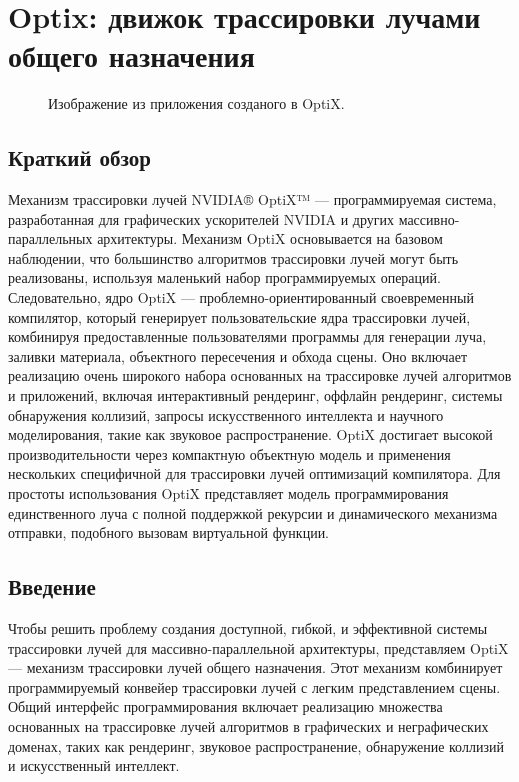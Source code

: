 \section{Optix: движок трассировки лучами общего назначения}
\begin{figure}[h]
\caption{Изображение из приложения созданого в OptiX.}
\label{audi}
\end{figure}
\subsection{Краткий обзор}
Механизм трассировки лучей NVIDIA® OptiX™ --- программируемая система, разработанная для графических ускорителей NVIDIA и других массивно-параллельных архитектуры.
Механизм OptiX основывается на базовом наблюдении, что большинство алгоритмов трассировки лучей могут быть реализованы, используя маленький набор программируемых операций. 
Следовательно, ядро OptiX --- проблемно-ориентированный своевременный компилятор, который генерирует пользовательские ядра трассировки лучей, комбинируя предоставленные пользователями программы для генерации луча, заливки материала, объектного пересечения и обхода сцены. 
Оно включает реализацию очень широкого набора основанных на трассировке лучей алгоритмов и приложений, включая интерактивный рендеринг, оффлайн рендеринг, системы обнаружения коллизий, запросы искусственного интеллекта и научного моделирования, такие как звуковое распространение. 
OptiX достигает высокой производительности через компактную объектную модель и применения нескольких специфичной для трассировки лучей оптимизаций компилятора. 
Для простоты использования OptiX представляет модель программирования единственного луча с полной поддержкой рекурсии и динамического механизма отправки, подобного вызовам виртуальной функции.

\subsection{Введение}
Чтобы решить проблему создания доступной, гибкой, и эффективной системы трассировки лучей для массивно-параллельной архитектуры, представляем OptiX --- механизм трассировки лучей общего назначения. 
Этот механизм комбинирует программируемый конвейер трассировки лучей с легким представлением сцены. 
Общий интерфейс программирования включает реализацию множества основанных на трассировке лучей алгоритмов в графических и неграфических доменах, таких как рендеринг, звуковое распространение, обнаружение коллизий и искусственный интеллект.

